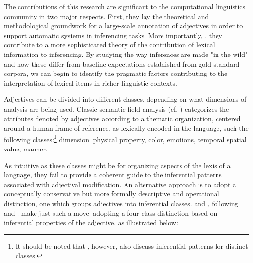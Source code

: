 \documentclass[10pt]{article}
\begin{document}
The contributions of this research are significant to the computational linguistics community in two major respects.  First, they lay the theoretical and  methodological groundwork for a large-scale annotation of adjectives in order to support automatic systems in inferencing tasks. More importantly, , they contribute to a more sophisticated theory of the contribution of lexical information to inferencing. By studying the way inferences are made "in the wild" and how these differ from baseline expectations established from gold standard corpora, we can begin to identify the pragmatic factors contributing to the interpretation of lexical items in richer linguistic contexts.


 
% 

Adjectives can be divided into different classes, depending on what dimensions of analysis are being used. Classic 
semantic field analysis (cf. \cite{dixon:91,lyons:77,raskin1995lexical})   categorizes the attributes denoted by adjectives according to a thematic organization, centered around a human frame-of-reference, as lexically encoded in  the language, such the following classes:\footnote{It should be noted that \cite{raskin1995lexical} , however, also discuss inferential patterns for distinct classes.}
{\sc dimension}, 
{\sc physical property}, {\sc color}, {\sc emotions}, {\sc temporal}
{\sc spatial}
{\sc value},
{\sc manner}. 

\noindent As intuitive as these classes might be for organizing aspects of the lexis of a language, they fail to provide a coherent guide to the inferential patterns associated with adjectival modification. 
An alternative approach is to 
 adopt a conceptually conservative but more formally descriptive and operational distinction, one which groups adjectives into inferential classes. \cite{amoia2006adjective} and \cite{amoia2008test}, following \cite{Kamp75twotheories} and \cite{Kamp95prototypetheory}, make just such a move, adopting a four class distinction based on inferential properties of the adjective, as illustrated below:
 
\end{document}
